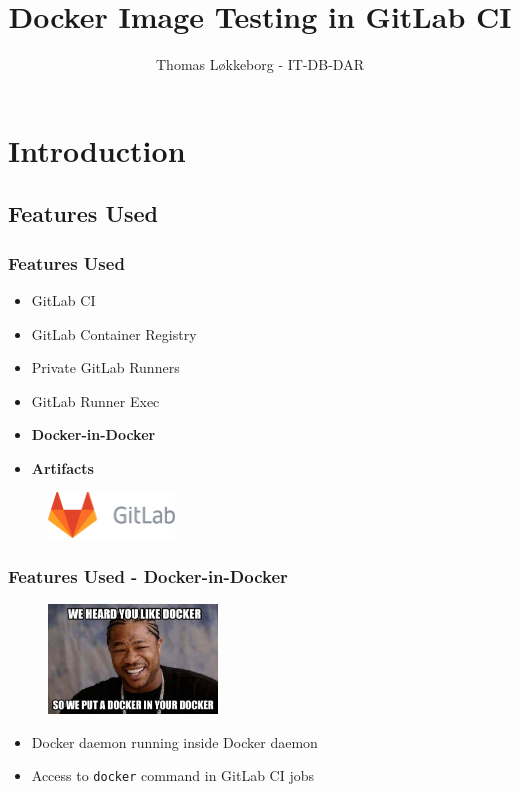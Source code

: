 \documentclass[14pt,aspectratio=169]{beamer}
\title[]{Docker Image Testing in GitLab CI}
\author[Author]{Thomas Løkkeborg - IT-DB-DAR}
\begin{document}

\cernSplashBlue

{
  \frame{\titlepage}
}
\setcounter{framenumber}{0}



\section{Introduction}

\subsection{Features Used}

\begin{frame}
  \frametitle{Features Used}
    \begin{itemize}
      \item GitLab CI
      \item GitLab Container Registry
      \item Private GitLab Runners
      \item GitLab Runner Exec
      \item \textbf{Docker-in-Docker}
      \item \textbf{Artifacts}
    \end{itemize}
  \begin{figure}
    \includegraphics[width=0.3\textwidth]{images/gitlab.png}
  \end{figure}
\end{frame}

\begin{frame}
  \frametitle{Features Used - Docker-in-Docker}
  \begin{figure}
    \includegraphics[width=0.4\textwidth]{images/dockerindocker.jpeg}
  \end{figure}
  \begin{itemize}
    \item Docker daemon running inside Docker daemon
    \item Access to \texttt{docker} command in GitLab CI jobs
  \end{itemize}
\end{frame}
\end{document}
